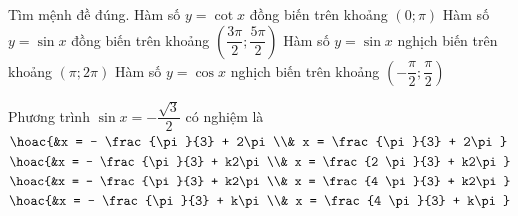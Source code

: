 \begin{ex}%
	Tìm mệnh đề đúng. 
	 \choice
		{Hàm số $y=\cot x$  đồng biến trên khoảng $\left( 0;\pi \right)$}
		{\True Hàm số $y=\sin x$ đồng biến trên khoảng $\left( \dfrac{3\pi  }{2};\dfrac{5\pi }{2} \right)$}
		{Hàm số $y=\sin x$ nghịch  biến trên khoảng $\left( \pi;2\pi \right)$}
		{Hàm số $y=\cos x$ nghịch biến trên khoảng  $\left( -\dfrac{\pi }{2};\dfrac{\pi }{2} \right)$}
\end{ex}

\begin{ex}%
	Phương trình $\sin  x = -\dfrac{\sqrt{3}}{2}$ có nghiệm là
	\choice 
		{$\hoac{&x = - \frac{\pi}{3}  + 2\pi \\& x = \frac{\pi}{3} + 2\pi}$}
		{$\hoac{&x  = - \frac{\pi}{3} + k2\pi \\& x = \frac{2 \pi}{3} + k2\pi}$}
		{\True $\hoac{&x = -  \frac{\pi}{3} + k2\pi \\& x = \frac{4 \pi}{3} + k2\pi}$}
		{$\hoac{&x  = - \frac{\pi}{3} + k\pi \\& x = \frac{4 \pi}{3} + k\pi}$}
\end{ex}



